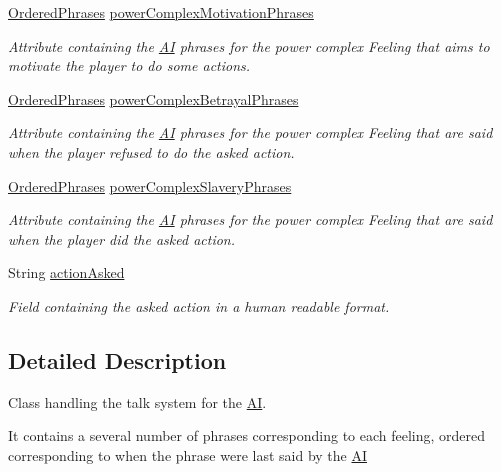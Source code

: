\begin{DoxyCompactItemize}
\hyperlink{classgameplay_1_1ai_1_1phrasing_1_1_ordered_phrases}{Ordered\-Phrases} \hyperlink{classgameplay_1_1ai_1_1phrasing_1_1_phrasing_ad566ad78166872e95e920833f4f36e90}{power\-Complex\-Motivation\-Phrases}
\begin{DoxyCompactList}\small\item\em Attribute containing the \hyperlink{classgameplay_1_1ai_1_1_a_i}{A\-I} phrases for the power complex Feeling that aims to motivate the player to do some actions. \end{DoxyCompactList}\item 
\hyperlink{classgameplay_1_1ai_1_1phrasing_1_1_ordered_phrases}{Ordered\-Phrases} \hyperlink{classgameplay_1_1ai_1_1phrasing_1_1_phrasing_a77e67b74525c919463d3c9b830fe895d}{power\-Complex\-Betrayal\-Phrases}
\begin{DoxyCompactList}\small\item\em Attribute containing the \hyperlink{classgameplay_1_1ai_1_1_a_i}{A\-I} phrases for the power complex Feeling that are said when the player refused to do the asked action. \end{DoxyCompactList}\item 
\hyperlink{classgameplay_1_1ai_1_1phrasing_1_1_ordered_phrases}{Ordered\-Phrases} \hyperlink{classgameplay_1_1ai_1_1phrasing_1_1_phrasing_afc6cf63da008d88b88e0e8138bb2fda9}{power\-Complex\-Slavery\-Phrases}
\begin{DoxyCompactList}\small\item\em Attribute containing the \hyperlink{classgameplay_1_1ai_1_1_a_i}{A\-I} phrases for the power complex Feeling that are said when the player did the asked action. \end{DoxyCompactList}\item 
String \hyperlink{classgameplay_1_1ai_1_1phrasing_1_1_phrasing_a613e36f3cca02a5ff83401e2373effd9}{action\-Asked}
\begin{DoxyCompactList}\small\item\em Field containing the asked action in a human readable format. \end{DoxyCompactList}\end{DoxyCompactItemize}


\subsection{Detailed Description}
Class handling the talk system for the \hyperlink{classgameplay_1_1ai_1_1_a_i}{A\-I}. 

It contains a several number of phrases corresponding to each feeling, ordered corresponding to when the phrase were last said by the \hyperlink{classgameplay_1_1ai_1_1_a_i}{A\-I} 

